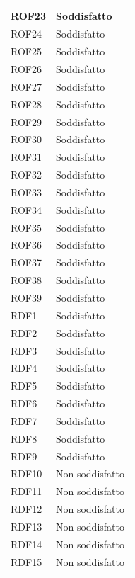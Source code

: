 \begin{longtable}{| p{2.5cm} | p{3cm} |}
	ROF23 & Soddisfatto \\ \hline
	\rowcolor{LightGray}
	ROF24 & Soddisfatto \\ \hline
	ROF25 & Soddisfatto \\ \hline
	\rowcolor{LightGray}
	ROF26 & Soddisfatto \\ \hline
	ROF27 & Soddisfatto \\ \hline
	\rowcolor{LightGray}
	ROF28 & Soddisfatto \\ \hline
	ROF29 & Soddisfatto \\ \hline
	\rowcolor{LightGray}
	ROF30 & Soddisfatto \\ \hline
	ROF31 & Soddisfatto \\ \hline
	\rowcolor{LightGray}
	ROF32 & Soddisfatto \\ \hline
	ROF33 & Soddisfatto \\ \hline
	\rowcolor{LightGray}
	ROF34 & Soddisfatto \\ \hline
	ROF35 & Soddisfatto \\ \hline
	\rowcolor{LightGray}
	ROF36 & Soddisfatto \\ \hline
	ROF37 & Soddisfatto \\ \hline
	\rowcolor{LightGray}
	ROF38 & Soddisfatto \\ \hline
	ROF39 & Soddisfatto \\ \hline
	\rowcolor{LightGray}
	RDF1 & Soddisfatto \\ \hline
	RDF2 & Soddisfatto \\ \hline
	\rowcolor{LightGray}
	RDF3 & Soddisfatto \\ \hline
	RDF4 & Soddisfatto \\ \hline
	\rowcolor{LightGray}
	RDF5 & Soddisfatto \\ \hline
	RDF6 & Soddisfatto \\ \hline
	\rowcolor{LightGray}
	RDF7 & Soddisfatto \\ \hline
	RDF8 & Soddisfatto \\ \hline
	\rowcolor{LightGray}
	RDF9 & Soddisfatto \\ \hline
	RDF10 & Non soddisfatto \\ \hline
	\rowcolor{LightGray}
	RDF11 & Non soddisfatto \\ \hline
	RDF12 & Non soddisfatto \\ \hline
	\rowcolor{LightGray}
	RDF13 & Non soddisfatto \\ \hline
	RDF14 & Non soddisfatto \\ \hline
	\rowcolor{LightGray}
	RDF15 & Non soddisfatto \\ \hline

\end{longtable}
